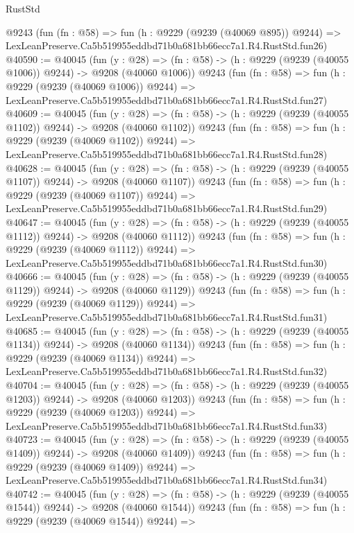 \begin{lexlean}{RustStd}
\begin{coremodule}
    @9243
    (fun (fn : @58) =>
    fun (h : @9229 (@9239 (@40069 @895)) @9244) =>
    LexLeanPreserve.Ca5b519955eddbd71b0a681bb66ecc7a1.R4.RustStd.fun26)
@40590 := @40045
    (fun (y : @28) =>
    (fn : @58) -> (h : @9229 (@9239 (@40055 @1006)) @9244) -> @9208 (@40060 @1006))
    @9243
    (fun (fn : @58) =>
    fun (h : @9229 (@9239 (@40069 @1006)) @9244) =>
    LexLeanPreserve.Ca5b519955eddbd71b0a681bb66ecc7a1.R4.RustStd.fun27)
@40609 := @40045
    (fun (y : @28) =>
    (fn : @58) -> (h : @9229 (@9239 (@40055 @1102)) @9244) -> @9208 (@40060 @1102))
    @9243
    (fun (fn : @58) =>
    fun (h : @9229 (@9239 (@40069 @1102)) @9244) =>
    LexLeanPreserve.Ca5b519955eddbd71b0a681bb66ecc7a1.R4.RustStd.fun28)
@40628 := @40045
    (fun (y : @28) =>
    (fn : @58) -> (h : @9229 (@9239 (@40055 @1107)) @9244) -> @9208 (@40060 @1107))
    @9243
    (fun (fn : @58) =>
    fun (h : @9229 (@9239 (@40069 @1107)) @9244) =>
    LexLeanPreserve.Ca5b519955eddbd71b0a681bb66ecc7a1.R4.RustStd.fun29)
@40647 := @40045
    (fun (y : @28) =>
    (fn : @58) -> (h : @9229 (@9239 (@40055 @1112)) @9244) -> @9208 (@40060 @1112))
    @9243
    (fun (fn : @58) =>
    fun (h : @9229 (@9239 (@40069 @1112)) @9244) =>
    LexLeanPreserve.Ca5b519955eddbd71b0a681bb66ecc7a1.R4.RustStd.fun30)
@40666 := @40045
    (fun (y : @28) =>
    (fn : @58) -> (h : @9229 (@9239 (@40055 @1129)) @9244) -> @9208 (@40060 @1129))
    @9243
    (fun (fn : @58) =>
    fun (h : @9229 (@9239 (@40069 @1129)) @9244) =>
    LexLeanPreserve.Ca5b519955eddbd71b0a681bb66ecc7a1.R4.RustStd.fun31)
@40685 := @40045
    (fun (y : @28) =>
    (fn : @58) -> (h : @9229 (@9239 (@40055 @1134)) @9244) -> @9208 (@40060 @1134))
    @9243
    (fun (fn : @58) =>
    fun (h : @9229 (@9239 (@40069 @1134)) @9244) =>
    LexLeanPreserve.Ca5b519955eddbd71b0a681bb66ecc7a1.R4.RustStd.fun32)
@40704 := @40045
    (fun (y : @28) =>
    (fn : @58) -> (h : @9229 (@9239 (@40055 @1203)) @9244) -> @9208 (@40060 @1203))
    @9243
    (fun (fn : @58) =>
    fun (h : @9229 (@9239 (@40069 @1203)) @9244) =>
    LexLeanPreserve.Ca5b519955eddbd71b0a681bb66ecc7a1.R4.RustStd.fun33)
@40723 := @40045
    (fun (y : @28) =>
    (fn : @58) -> (h : @9229 (@9239 (@40055 @1409)) @9244) -> @9208 (@40060 @1409))
    @9243
    (fun (fn : @58) =>
    fun (h : @9229 (@9239 (@40069 @1409)) @9244) =>
    LexLeanPreserve.Ca5b519955eddbd71b0a681bb66ecc7a1.R4.RustStd.fun34)
@40742 := @40045
    (fun (y : @28) =>
    (fn : @58) -> (h : @9229 (@9239 (@40055 @1544)) @9244) -> @9208 (@40060 @1544))
    @9243
    (fun (fn : @58) =>
    fun (h : @9229 (@9239 (@40069 @1544)) @9244) =>

\end{coremodule}
\end{lexlean}
